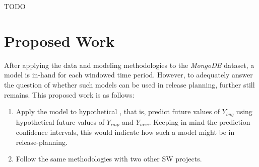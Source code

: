 \documentclass[a4paper]{scrartcl}
\begin{document}
TODO 
%
%

\section*{Proposed Work}
\label{sec:proposed_work}

After applying the data and modeling methodologies to the \textit{MongoDB} dataset, a model is in-hand for each windowed time period. However, to adequately answer the question of whether such models can be used in release planning, further still remains. This proposed work is as follows:

\begin{enumerate}
\item
Apply the model to hypothetical , that is, predict future values of $Y_{bug}$ using hypothetical future values of $Y_{imp}$ and $Y_{new}$. Keeping in mind the prediction confidence intervals, this would indicate how such a model might be in release-planning.

\item
Follow the same methodologies with two other SW projects.
\end{enumerate}
\end{document}
